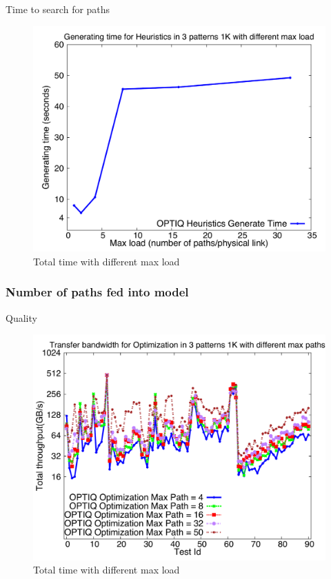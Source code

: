 Time to search for paths

\begin{figure}[!htb]
\vspace{-0.1in}
\centering
\includegraphics[scale=0.30]{figures/heu_time.pdf}
\vspace{-0.1in}
\caption{Total time with different max load}
\vspace{-0.1in}
\label{fig:heu_time}
\end{figure}

\subsubsection{Number of paths fed into model}

Quality

\begin{figure}[!htb]
\vspace{-0.1in}
\centering
\includegraphics[scale=0.30]{figures/opt_paths.pdf}
\vspace{-0.1in}
\caption{Total time with different max load}
\vspace{-0.1in}
\label{fig:opt_paths}
\end{figure}

